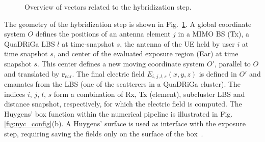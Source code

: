 \documentclass{IEEEtran}
\begin{document}
\begin{figure}[h]
    \centering
    
    \caption{Overview of vectors related to the hybridization step.}
    \label{fig:hybridization_step}
\end{figure}
The geometry of the hybridization step is shown in Fig.~\ref{fig:hybridization_step}. A global coordinate system $O$ defines the positions of an antenna element $j$ in a MIMO \gls{BS} (Tx), a QuaDRiGa \gls{LBS} $l$ at time-snapshot $s$, the antenna of the \gls{UE} held by user $i$ at time snapshot $s$, and center of the evaluated exposure region (Ear) at time snapshot $s$. This center defines a new moving coordinate system $O'$, parallel to $O$ and translated by $\mathbf{r}_\mathrm{ear}$. The final electric field $E_{i,j,l,s}(x,y,z)$ is defined in $O'$ and emanates from the \gls{LBS} (one of the scatterers in a QuaDRiGa cluster). The indices $i$, $j$, $l$, $s$ form a combination of Rx, Tx (element), subcluster \gls{LBS} and distance snapshot, respectively, for which the electric field is computed. The Huygens' box function within the numerical pipeline is illustrated in Fig. \ref{fig:nyc_config}(b).  A Huygens' surface is used as interface with the exposure step, requiring saving the fields only on the surface of the box~\cite{HuygensBox}. 
\end{document}
